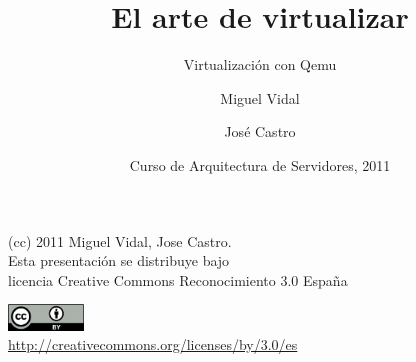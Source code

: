 \documentclass{beamer}
\begin{document}
\title{El arte de virtualizar}
\subtitle{Virtualización con Qemu}
\author{Miguel Vidal \and José Castro}
\date[CASUL 2011]{Curso de Arquitectura de Servidores, 2011}


\begin{frame}
  \vspace{2cm}
  \begin{flushright}
    {\small (cc) 2011 Miguel Vidal, Jose Castro.} \\
    \medskip
    {\scriptsize Esta presentación se distribuye bajo \\ licencia Creative Commons Reconocimiento 3.0 España}
  \end{flushright}
  \begin{center}
    \href{http://creativecommons.org/licenses/by/3.0/es}{\includegraphics[width=2cm]{format/cc-by.png}} \\
    {\tiny \url{http://creativecommons.org/licenses/by/3.0/es}}
  \end{center}
\end{frame}%


\usebackgroundtemplate{}



\end{document}
